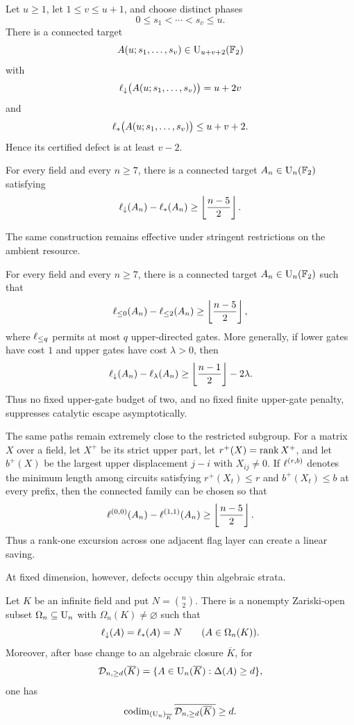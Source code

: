 \begin{theorem}\label{g:thm:snapshot-family}
Let $u\ge1$, let $1\le v\le u+1$, and choose distinct phases
\[
0\le s_1<\cdots<s_v\le u.
\]
There is a connected target
\[
A(u;s_1,\ldots,s_v)\in\operatorname{U}_{u+v+2}(\mathbb F_2)
\]
with
\[
\ell_{\downarrow}\bigl(A(u;s_1,\ldots,s_v)\bigr)=u+2v
\]
and
\[
\ell_{*}\bigl(A(u;s_1,\ldots,s_v)\bigr)\le u+v+2.
\]
Hence its certified defect is at least $v-2$.
\end{theorem}

\begin{corollary}\label{g:cor:connected-gap}
For every field and every $n\ge7$, there is a connected target $A_n\in\operatorname{U}_n(\mathbb F_2)$ satisfying
\[
\ell_{\downarrow}(A_n)-\ell_{*}(A_n)
\ge
\left\lfloor\frac{n-5}{2}\right\rfloor.
\]
\end{corollary}

The same construction remains effective under stringent restrictions on the ambient resource.

\begin{theorem}\label{g:thm:resource-robustness}
For every field and every $n\ge7$, there is a connected target $A_n\in\operatorname{U}_n(\mathbb F_2)$ such that
\[
\ell_{\le 0}(A_n)-\ell_{\le 2}(A_n)
\ge
\left\lfloor\frac{n-5}{2}\right\rfloor,
\]
where $\ell_{\le q}$ permits at most $q$ upper-directed gates.  More generally, if lower gates have cost $1$ and upper gates have cost $\lambda>0$, then
\[
\ell_{\downarrow}(A_n)-\ell_{\lambda}(A_n)
\ge
\left\lfloor\frac{n-1}{2}\right\rfloor-2\lambda.
\]
Thus no fixed upper-gate budget of two, and no fixed finite upper-gate penalty, suppresses catalytic escape asymptotically.
\end{theorem}

The same paths remain extremely close to the restricted subgroup.  For a matrix $X$ over a field, let $X^+$ be its strict upper part, let $r^+(X)=\operatorname{rank} X^+$, and let $b^+(X)$ be the largest upper displacement $j-i$ with $X_{ij}\ne0$.  If $\ell^{(r,b)}$ denotes the minimum length among circuits satisfying $r^+(X_t)\le r$ and $b^+(X_t)\le b$ at every prefix, then the connected family can be chosen so that
\[
\ell^{(0,0)}(A_n)-\ell^{(1,1)}(A_n)
\ge
\left\lfloor\frac{n-5}{2}\right\rfloor.
\]
Thus a rank-one excursion across one adjacent flag layer can create a linear saving.

At fixed dimension, however, defects occupy thin algebraic strata.

\begin{theorem}\label{g:thm:generic-rigidity-intro}
Let $K$ be an infinite field and put $N=\binom n2$.  There is a nonempty Zariski-open subset $\Omega_n\subseteq\operatorname{U}_n$ with $\Omega_n(K)\ne\varnothing$ such that
\[
\ell_{\downarrow}(A)=\ell_{*}(A)=N
\qquad(A\in\Omega_n(K)).
\]
Moreover, after base change to an algebraic closure $\overline K$, for
\[
\mathcal D_{n,\ge d}(\overline K)
=\{A\in\operatorname{U}_n(\overline K):\Delta(A)\ge d\},
\]
one has
\[
\operatorname{codim}_{(\operatorname{U}_n)_{\overline K}}
\overline{\mathcal D_{n,\ge d}(\overline K)}\ge d.
\]
\end{theorem}


